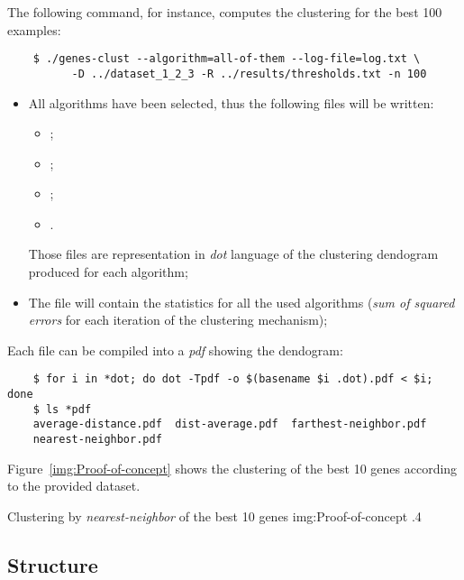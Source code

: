     The following command, for instance, computes the clustering for the
    best 100 examples:
    \begin{verbatim}
    $ ./genes-clust --algorithm=all-of-them --log-file=log.txt \
          -D ../dataset_1_2_3 -R ../results/thresholds.txt -n 100
    \end{verbatim}
    \begin{itemize}
    \item   All algorithms have been selected, thus the following files
            will be written:
            \begin{itemize}
            \item   {};
            \item   {};
            \item   {};
            \item   {}.
            \end{itemize}
            Those files are representation in \emph{dot} language of the
            clustering dendogram produced for each algorithm;
    \item   The file  will contain the statistics for
            all the used algorithms (\emph{sum of squared errors} for each
            iteration of the clustering mechanism);
    \end{itemize}

    Each  file can be compiled into a \emph{pdf} showing
    the dendogram:
    \begin{verbatim}
    $ for i in *dot; do dot -Tpdf -o $(basename $i .dot).pdf < $i; done
    $ ls *pdf
    average-distance.pdf  dist-average.pdf  farthest-neighbor.pdf
    nearest-neighbor.pdf
    \end{verbatim}
    Figure~\ref{img:Proof-of-concept} shows the clustering of the best 10
    genes according to the provided dataset.

          {Clustering by \emph{nearest-neighbor} of the best 10 genes}
          {img:Proof-of-concept}
          {.4\textwidth}

\subsection{ Structure }

